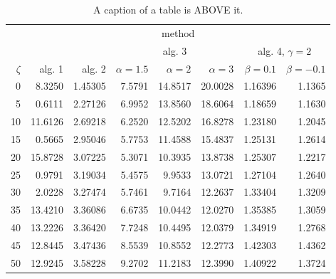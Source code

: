 \begin{table}
\centering
\caption{A caption of a table is ABOVE it.}
\label{tab:results}
\begin{tabular}{rrrrrrrr}
\toprule
	         &                                     \multicolumn{7}{c}{method}                                      \\
	         \cmidrule{2-8}
	         &         &         &        \multicolumn{3}{c}{alg. 3}        & \multicolumn{2}{c}{alg. 4, $\gamma = 2$} \\
	         \cmidrule(r){4-6}\cmidrule(r){7-8}
	$\zeta$ &     alg. 1 &   alg. 2 & $\alpha= 1.5$ & $\alpha= 2$ & $\alpha= 3$ &   $\beta = 0.1$  &   $\beta = -0.1$ \\
\midrule
	       0 &  8.3250 & 1.45305 &       7.5791 &    14.8517 &    20.0028 & 1.16396 &                       1.1365 \\
	       5 &  0.6111 & 2.27126 &       6.9952 &    13.8560 &    18.6064 & 1.18659 &                       1.1630 \\
	      10 & 11.6126 & 2.69218 &       6.2520 &    12.5202 &    16.8278 & 1.23180 &                       1.2045 \\
	      15 &  0.5665 & 2.95046 &       5.7753 &    11.4588 &    15.4837 & 1.25131 &                       1.2614 \\
	      20 & 15.8728 & 3.07225 &       5.3071 &    10.3935 &    13.8738 & 1.25307 &                       1.2217 \\
	      25 &  0.9791 & 3.19034 &       5.4575 &     9.9533 &    13.0721 & 1.27104 &                       1.2640 \\
	      30 &  2.0228 & 3.27474 &       5.7461 &     9.7164 &    12.2637 & 1.33404 &                       1.3209 \\
	      35 & 13.4210 & 3.36086 &       6.6735 &    10.0442 &    12.0270 & 1.35385 &                       1.3059 \\
	      40 & 13.2226 & 3.36420 &       7.7248 &    10.4495 &    12.0379 & 1.34919 &                       1.2768 \\
	      45 & 12.8445 & 3.47436 &       8.5539 &    10.8552 &    12.2773 & 1.42303 &                       1.4362 \\
	      50 & 12.9245 & 3.58228 &       9.2702 &    11.2183 &    12.3990 & 1.40922 &                       1.3724 \\
\bottomrule
\end{tabular}
\end{table}  


